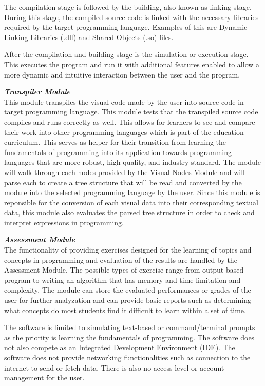 \parx
The compilation stage is followed by the building, also known as linking stage.
During this stage, the compiled source code is linked with the necessary libraries
required by the target programming language. Examples of this are Dynamic Linking
Libraries (.dll) and Shared Objects (.so) files.

\parx
After the compilation and building stage is the simulation or execution stage.  This
executes the program and run it with additional features enabled to allow a more
dynamic and intuitive interaction between the user and the program.

\flushleft
\textbf{\textit{Transpiler Module}}\\
\justifying
\parx
This module transpiles the visual code made by the user into source code in target
programming language. This module tests that the transpiled source code compiles
and runs correctly as well. This allows for learners to see and compare their
work into other programming languages which is part of the education curriculum.
This serves as helper for their transition from learning the fundamentals of
programming into its application towards programming languages that are more
robust, high quality, and industry-standard. The module will walk through each
nodes provided by the Visual Nodes Module and will parse each to create a tree
structure that will be read and converted by the module into the selected
programming language by the user.  Since this module is reponsible for the
conversion of each visual data into their corresponding textual data, this
module also evaluates the parsed tree structure in order to check and interpret
expressions in programming.

\flushleft
\textbf{\textit{Assessment Module}}\\
\justifying
\parx
The functionality of providing exercises designed for the learning of topics and
concepts in programming and evaluation of the results are handled by the Assessment
Module. The possible types of exercise range from output-based program to writing
an algorithm that has memory and time limitation and complexity. The module can
store the evaluated performances or grades of the user for further analyzation
and can provide basic reports such as determining what concepts do most students
find it difficult to learn within a set of time.

\parx
The software is limited to simulating text-based or command/terminal prompts as the
priority is learning the fundamentals of programming. The software does not also
compete as an Integrated Development Environment (IDE). The software does not provide
networking functionalities such as connection to the internet to send or fetch data.
There is also no access level or account management for the user.\\
